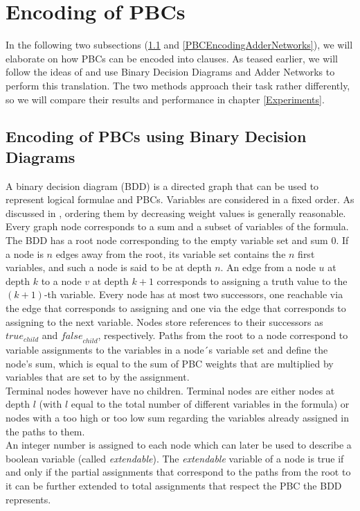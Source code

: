 \section{Encoding of PBCs}
In the following two subsections (\ref{PBCEncodingBDD} and \ref{PBCEncodingAdderNetworks}), we will elaborate on how PBCs can be encoded into clauses. As teased earlier, we will follow the ideas of \cite{Een2006TranslatingPC} and use Binary Decision Diagrams and Adder Networks to perform this translation. The two methods approach their task rather differently, so we will compare their results and performance in chapter \ref{Experiments}.

\subsection{Encoding of PBCs using Binary Decision Diagrams}\label{PBCEncodingBDD}
A binary decision diagram (BDD) is a directed graph that can be used to represent logical formulae and PBCs. 
Variables are considered in a fixed order. As discussed in \cite{Een2006TranslatingPC}, ordering them by decreasing weight values is generally reasonable. Every graph node corresponds to a sum and a subset of variables of the formula. The BDD has a root node corresponding to the empty variable set and sum 0. If a node is $n$ edges away from the root, its variable set contains the $n$ first variables, and such a node is said to be at depth $n$. An edge from a node $u$ at depth $k$ to a node $v$ at depth $k+1$ corresponds to assigning a truth value to the $(k+1)$-th variable. Every node has at most two successors, one reachable via the edge that corresponds to assigning \true{} and one via the edge that corresponds to assigning \false{} to the next variable. Nodes store references to their successors as \emph{$\textit{true}_{child}$} and \emph{$\textit{false}_{child}$}, respectively. Paths from the root to a node correspond to variable assignments to the variables in a node´s variable set and define the node's sum, which is equal to the sum of PBC weights that are multiplied by variables that are set to \true{} by the assignment.\\

Terminal nodes however have no children. Terminal nodes are either nodes at depth $l$ (with $l$ equal to the total number of different variables in the formula) or nodes with a too high or too low sum regarding the variables already assigned in the paths to them.\\

An integer number is assigned to each node which can later be used to describe a boolean variable (called \emph{extendable}). The  \emph{extendable} variable of a node is true if and only if the partial assignments that correspond to the paths from the root to it can be further extended to total assignments that respect the PBC the BDD represents.\\

